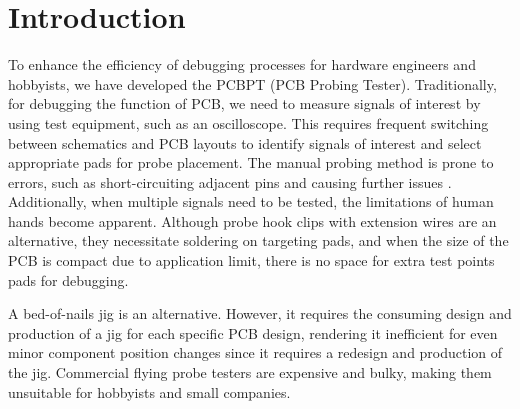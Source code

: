 \documentclass[sigconf]{acmart}
\begin{document}


\maketitle

\section{Introduction}
To enhance the efficiency of debugging processes for hardware engineers and hobbyists, we have developed the PCBPT (PCB Probing Tester). Traditionally, for debugging the function of PCB, we need to measure signals of interest by using test equipment, such as an oscilloscope. This requires frequent switching between schematics and PCB layouts to identify signals of interest and select appropriate pads for probe placement. The manual probing method is prone to errors, such as short-circuiting adjacent pins and causing further issues \cite{automatic_compactpcbdebugging}. Additionally, when multiple signals need to be tested, the limitations of human hands become apparent. Although probe hook clips with extension wires are an alternative, they necessitate soldering on targeting pads, and when the size of the PCB is compact due to application limit, there is no space for extra test points pads for debugging.

A bed-of-nails jig is an alternative. However, it requires the consuming design and production of a jig for each specific PCB design, rendering it inefficient for even minor component position changes since it requires a redesign and production of the jig. Commercial flying probe testers are expensive and bulky, making them unsuitable for hobbyists and small companies.
\end{document}
